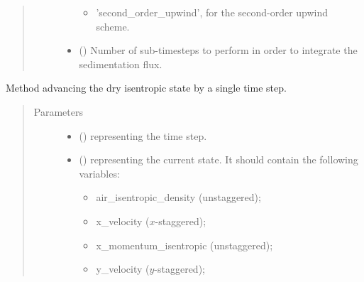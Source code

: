 \documentclass[letterpaper,10pt,english]{sphinxmanual}
\begin{document}
\begin{fulllineitems}
\begin{fulllineitems}
\begin{quote}
\begin{description}
\begin{itemize}
\begin{itemize}
\item {} 
’second\_order\_upwind’, for the second-order upwind scheme.

\end{itemize}


\item {} 
 () \textendash{} Number of sub-timesteps to perform in order to integrate the sedimentation flux.

\end{itemize}

\end{description}\end{quote}

\end{fulllineitems}


\begin{fulllineitems}
\label{\detokenize{api:dycore.dycore_isentropic.DynamicalCoreIsentropic._step_dry}}
Method advancing the dry isentropic state by a single time step.
\begin{quote}\begin{description}
\item[{Parameters}] \leavevmode\begin{itemize}
\item {} 
 () \textendash{}  representing the time step.

\item {} 
 () \textendash{} 
{\hyperref[\detokenize{api:storages.state_isentropic.StateIsentropic}]{}} representing the current state.
It should contain the following variables:
\begin{itemize}
\item {} 
air\_isentropic\_density (unstaggered);

\item {} 
x\_velocity (\(x\)-staggered);

\item {} 
x\_momentum\_isentropic (unstaggered);

\item {} 
y\_velocity (\(y\)-staggered);


\end{itemize}
\end{itemize}
\end{description}
\end{quote}
\end{fulllineitems}
\end{fulllineitems}
\end{document}
